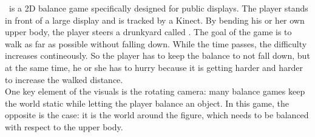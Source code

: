 \drunkened\ is a 2D balance game specifically designed for public displays. The player stands in front of a large display and is tracked by a Kinect. By bending his or her own upper body, the player steers a drunkyard called \textit{\ed}. The goal of the game is to walk as far as possible without falling down. While the time passes, the difficulty increases contineously. So the player has to keep the balance to not fall down, but at the same time, he or she has to hurry because it is getting harder and harder to increase the walked distance.\\
One key element of the visuals is the rotating camera: many balance games keep the world static while letting the player balance an object. In this game, the opposite is the case: it is the world around the figure, which needs to be balanced with respect to the upper body. 


